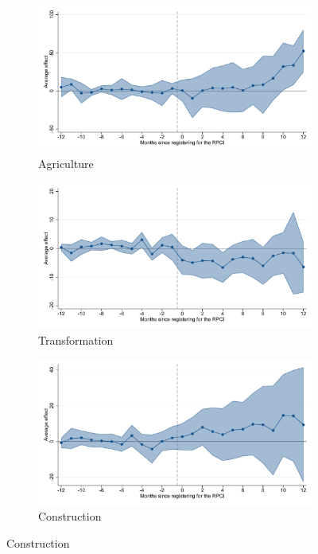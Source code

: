 \begin{figure}[H]
    \begin{subfigure}{0.32\textwidth}
    \caption{Agriculture}
    \includegraphics[width=\textwidth]{04_Figures/muestra_10porciento/event_study_sal_formal_ind_agricul_dcdh_connected.pdf}
    \end{subfigure}
    \begin{subfigure}{0.32\textwidth}
    \caption{Transformation}
    \includegraphics[width=\textwidth]{04_Figures/muestra_10porciento/event_study_sal_formal_ind_transf_dcdh_connected.pdf}
    \end{subfigure}
    \begin{subfigure}{0.32\textwidth}
    \caption{Construction}
    \includegraphics[width=\textwidth]{04_Figures/muestra_10porciento/event_study_sal_formal_ind_constr_dcdh_connected.pdf}
    \end{subfigure}


\end{figure}
